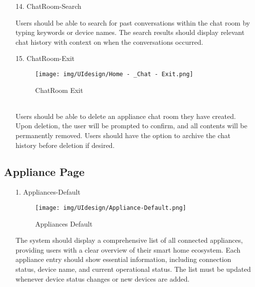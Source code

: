 \documentclass[conference]{IEEEtran}
\begin{document}
\begin{enumerate}
\begin{itemize}
\begin{itemize}
\begin{enumerate}
\begin{enumerate}
    \item[14.] ChatRoom-Search
    
    Users should be able to search for past conversations within the chat room by typing keywords or device names. The search results should display relevant chat history with context on when the conversations occurred. \\ 
\end{enumerate}

\begin{enumerate}
    \item[15.] ChatRoom-Exit
    \begin{figure}[h]
        {\centering
        \hspace{4cm}
        \begin{minipage}{0.4\columnwidth}
            \texttt{[image: img/UIdesign/Home - \_Chat - Exit.png]}
            \caption{ChatRoom Exit}
        \end{minipage}}
    \end{figure}
    \\ Users should be able to delete an appliance chat room they have created. Upon deletion, the user will be prompted to confirm, and all contents will be permanently removed. Users should have the option to archive the chat history before deletion if desired.
\end{enumerate}

\clearpage

\subsection{Appliance Page}
    \begin{enumerate}
    \item[1.] Appliances-Default
    \begin{figure}[h]
        {\centering
        \hspace{4cm}
        \begin{minipage}{0.4\columnwidth}
            \texttt{[image: img/UIdesign/Appliance-Default.png]}
            \caption{Appliances Default}
        \end{minipage}}
    \end{figure}

    The system should display a comprehensive list of all connected appliances, providing users with a clear overview of their smart home ecosystem. Each appliance entry should show essential information, including connection status, device name, and current operational status. The list must be updated whenever device status changes or new devices are added. \\ 
\end{enumerate}


\end{enumerate}
\end{itemize}
\end{itemize}
\end{enumerate}
\end{document}
